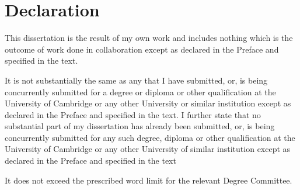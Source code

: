 \chapter*{Declaration}


This dissertation is the result of my own work and includes nothing which is the outcome of work done in collaboration except as declared in the Preface and specified in the text.

It is not substantially the same as any that I have submitted, or, is being concurrently submitted for a degree or diploma or other qualification at the University of Cambridge or any other University or similar institution except as declared in the Preface and specified in the text. I further state that no substantial part of my dissertation has already been submitted, or, is being concurrently submitted for any such degree, diploma or other qualification at the University of Cambridge or any other University of similar institution except as declared in the Preface and specified in the text


It does not exceed the prescribed word limit for the relevant Degree Committee.  


